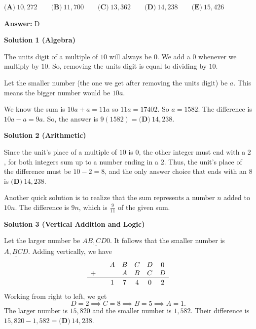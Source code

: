 \begin{enumerate}
 $\textbf{(A)} ~10{,}272\qquad\textbf{(B)} ~11{,}700\qquad\textbf{(C)} ~13{,}362\qquad\textbf{(D)} ~14{,}238\qquad\textbf{(E)} ~15{,}426$

 \textbf{Answer: }D



\textbf{Solution 1 (Algebra)}

The units digit of a multiple of $10$ will always be $0$. We add a $0$ whenever we multiply by $10$. So, removing the units digit is equal to dividing by $10$.

 Let the  smaller number (the one we get after removing the units digit) be $a$. This means the bigger number would be $10a$.

 We know the sum is $10a+a = 11a$ so $11a=17402$. So $a=1582$. The difference is $10a-a = 9a$. So, the answer is $9(1582) = \boxed{\textbf{(D)} ~14{,}238}$.

 



\textbf{Solution 2 (Arithmetic)}

Since the unit's place of a multiple of $10$ is $0$, the other integer must end with a $2$, for both integers sum up to a number ending in a $2$. Thus, the unit's place of the difference must be $10-2=8$, and the only answer choice that ends with an $8$ is $\boxed{\textbf{(D)} ~14{,}238}$.

 Another quick solution is to realize that the sum represents a number $n$ added to $10n$. The difference is $9n$, which is $\frac{9}{11}$ of the given sum.

 



\textbf{Solution 3 (Vertical Addition and Logic)}

Let the larger number be $\underline{AB{,}CD0}.$ It follows that the smaller number is $\underline{A{,}BCD}.$ Adding vertically, we have 
 \[\begin{array}{cccccc}   & A & B & C & D & 0 \\ +\quad &   & A & B & C & D \\ \hline   &   &   &   &   &   \\ [-2.5ex]   & 1 & 7 & 4 & 0 & 2 \\ \end{array}\]Working from right to left, we get 
 \[D=2\implies C=8 \implies B=5 \implies A=1.\]The larger number is $15{,}820$ and the smaller number is $1{,}582.$ Their difference is $15{,}820-1{,}582=\boxed{\textbf{(D)} ~14{,}238}.$





\end{enumerate}
